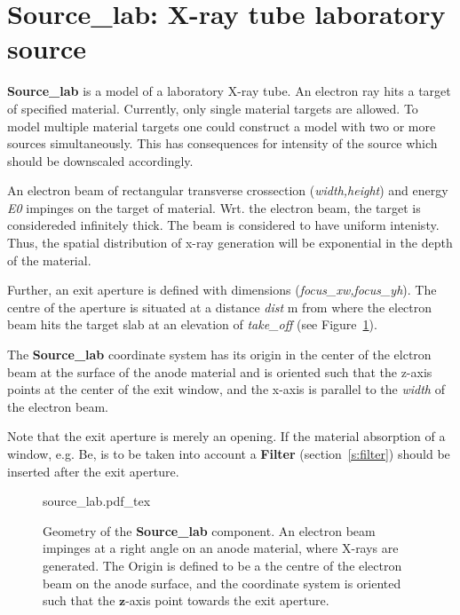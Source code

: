 \section{Source\_lab: X-ray tube laboratory source}
\label{s:source-lab}


\textbf{Source\_lab} is a model of a laboratory X-ray tube. An electron ray hits a
target of specified material. Currently, only single material targets are
allowed. To model multiple material targets one could construct a model with two
or more sources simultaneously. This has consequences for intensity of the source which should be downscaled accordingly.

An electron beam of rectangular transverse crossection (\textit{width,height}) and energy \textit{E0}
impinges on the target of material. Wrt. the electron beam, the target is
considereded infinitely thick. The beam is considered to have uniform
intenisty. Thus, the spatial distribution of x-ray generation will be
exponential in the depth of the material.

Further, an exit aperture is defined with dimensions
(\textit{focus\_xw,focus\_yh}). The centre of the aperture is situated at a
distance \textit{dist} \si{m} from where the electron beam hits the target slab
at an elevation of \textit{take\_off} (see Figure~\ref{f:source_lab}).  

The \textbf{Source\_lab} coordinate system has its origin in the center of the
elctron beam at the surface of the
anode material and is oriented such that the z-axis points at the center of the
exit window, and the x-axis is parallel to the \emph{width} of the electron
beam. 

Note that the exit aperture is merely an opening. If the
material absorption of a window, e.g. Be, is to be taken into account a
\textbf{Filter} (section~\ref{s:filter}) should be inserted after the exit
aperture. 

\begin{figure}
\label{f:source_lab}
\centering
\def\svgwidth{\columnwidth}
%
{source_lab.pdf_tex}
\caption{Geometry of the \textbf{Source\_lab} component. An electron beam impinges at a right angle on
an anode material, where X-rays are generated. The Origin is defined to be a the centre of the electron beam
on the anode surface, and the coordinate system is oriented such that the $\boldsymbol{z}$-axis point towards
the exit aperture.} 
\end{figure}

